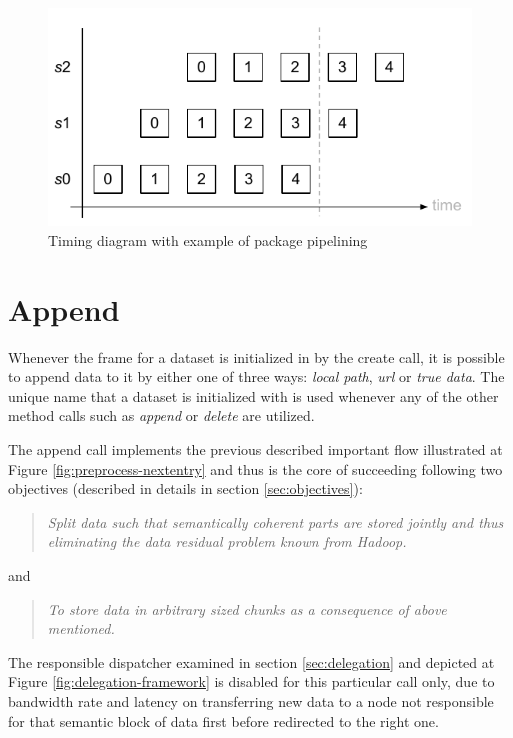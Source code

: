 \begin{figure}[ht!]
	\centering
	\includegraphics[scale=1.1]{pdf/package-pipeline.pdf}
	\caption{Timing diagram with example of package pipelining \label{fig:package-pipeline}}
\end{figure}	

\section{Append} \label{sec:api-append}
Whenever the frame for a dataset is initialized in \CodeName by the create call, it is possible to append data to it by either one of three ways: \textit{local path}, \textit{url} or \textit{true data}. The unique name that a dataset is initialized with is used whenever any of the other method calls such as \textit{append} or \textit{delete} are utilized. 
\newline

The append call implements the previous described important flow illustrated at Figure \ref{fig:preprocess-nextentry} and thus is the core of succeeding following two objectives (described in details in section \ref{sec:objectives}):

\begin{quotation}
	\textit{Split data such that semantically coherent parts are stored jointly and thus eliminating the data residual problem known from Hadoop.}
\end{quotation}
\noindent
and
\begin{quotation}
	\textit{To store data in arbitrary sized chunks as a consequence of above mentioned.}
\end{quotation}

The responsible dispatcher examined in section \ref{sec:delegation} and depicted at Figure \ref{fig:delegation-framework} is disabled for this particular call only, due to bandwidth rate and latency on transferring new data to a node not responsible for that semantic block of data first before redirected to the right one.

